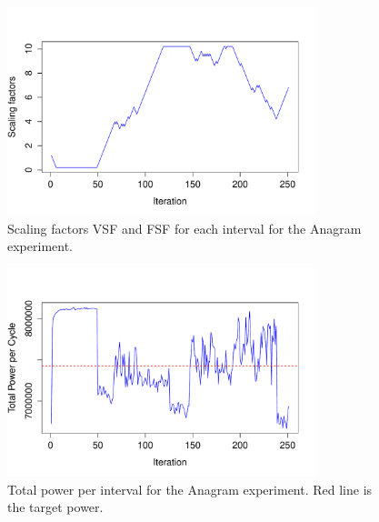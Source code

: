\documentclass[10pt]{scrartcl}
\begin{document}
\begin{figure}
  \centering
  \includegraphics[width=0.8\textwidth]{ScalingFactorsVsIterationAnagram}
  \caption{Scaling factors VSF and FSF for each interval for the Anagram experiment.}\label{fig:anagram1}
\end{figure}

\begin{figure}
  \centering
  \includegraphics[width=0.8\textwidth]{TotalPowerVsIterationAnagram}
  \caption{Total power per interval for the Anagram experiment.  Red line is the target power.}\label{fig:anagram2}
\end{figure}
\end{document}
